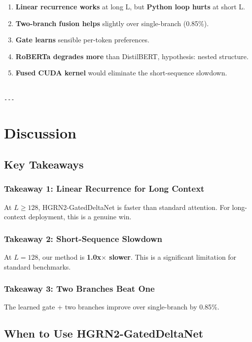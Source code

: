\begin{enumerate}
\item \textbf{Linear recurrence works} at long L, but \textbf{Python loop hurts} at short L.
\item \textbf{Two-branch fusion helps} slightly over single-branch (0.85\%).
\item \textbf{Gate learns} sensible per-token preferences.
\item \textbf{RoBERTa degrades more} than DistilBERT, hypothesis: nested structure.
\item \textbf{Fused CUDA kernel} would eliminate the short-sequence slowdown.
\end{enumerate}
\begin{lstlisting}

---
\end{lstlisting}

\section{Discussion}

\subsection{Key Takeaways}

\subsubsection{Takeaway 1: Linear Recurrence for Long Context}

At $L \geq 128$, HGRN2-GatedDeltaNet is faster than standard 
attention. For long-context deployment, this is a genuine win.

\subsubsection{Takeaway 2: Short-Sequence Slowdown}

At $L = 128$, our method is \textbf{1.0x$\times$ slower}. This is a significant 
limitation for standard benchmarks.

\subsubsection{Takeaway 3: Two Branches Beat One}

The learned gate + two branches improve over single-branch by 
0.85\%.

\subsection{When to Use HGRN2-GatedDeltaNet}


